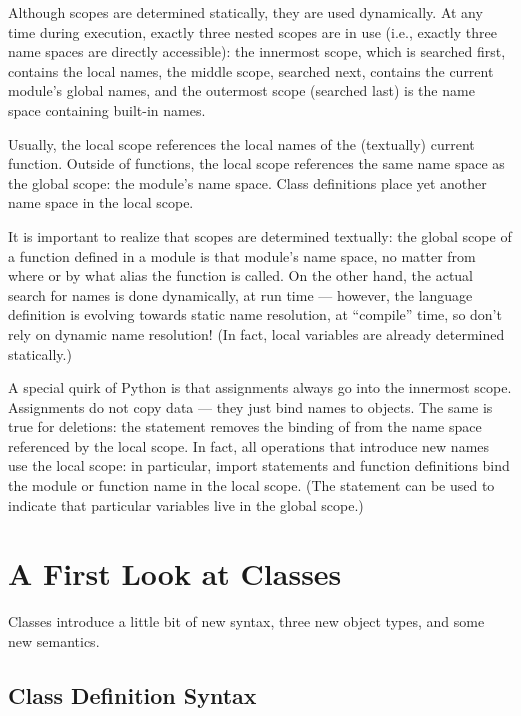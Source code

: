 \documentclass{manual}
\begin{document}
Although scopes are determined statically, they are used dynamically.
At any time during execution, exactly three nested scopes are in use
(i.e., exactly three name spaces are directly accessible): the
innermost scope, which is searched first, contains the local names,
the middle scope, searched next, contains the current module's global
names, and the outermost scope (searched last) is the name space
containing built-in names.

Usually, the local scope references the local names of the (textually)
current function.  Outside of functions, the local scope references
the same name space as the global scope: the module's name space.
Class definitions place yet another name space in the local scope.

It is important to realize that scopes are determined textually: the
global scope of a function defined in a module is that module's name
space, no matter from where or by what alias the function is called.
On the other hand, the actual search for names is done dynamically, at
run time --- however, the language definition is evolving towards
static name resolution, at ``compile'' time, so don't rely on dynamic
name resolution!  (In fact, local variables are already determined
statically.)

A special quirk of Python is that assignments always go into the
innermost scope.  Assignments do not copy data --- they just
bind names to objects.  The same is true for deletions: the statement
 removes the binding of  from the name space
referenced by the local scope.  In fact, all operations that introduce
new names use the local scope: in particular, import statements and
function definitions bind the module or function name in the local
scope.  (The  statement can be used to indicate that
particular variables live in the global scope.)


\section{A First Look at Classes \label{firstClasses}}

Classes introduce a little bit of new syntax, three new object types,
and some new semantics.


\subsection{Class Definition Syntax \label{classDefinition}}
\end{document}
